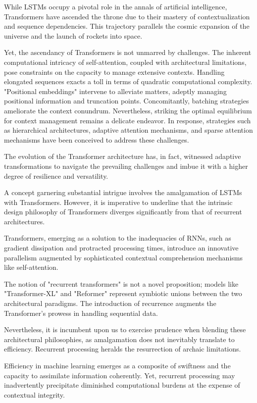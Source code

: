 \documentclass{article}
\begin{document}
While LSTMs occupy a pivotal role in the annals of artificial intelligence, Transformers have ascended the throne due to their mastery of contextualization and sequence dependencies. This trajectory parallels the cosmic expansion of the universe and the launch of rockets into space.

Yet, the ascendancy of Transformers is not unmarred by challenges. The inherent computational intricacy of self-attention, coupled with architectural limitations, pose constraints on the capacity to manage extensive contexts. Handling elongated sequences exacts a toll in terms of quadratic computational complexity. "Positional embeddings" intervene to alleviate matters, adeptly managing positional information and truncation points. Concomitantly, batching strategies ameliorate the context conundrum. Nevertheless, striking the optimal equilibrium for context management remains a delicate endeavor. In response, strategies such as hierarchical architectures, adaptive attention mechanisms, and sparse attention mechanisms have been conceived to address these challenges.

The evolution of the Transformer architecture has, in fact, witnessed adaptive transformations to navigate the prevailing challenges and imbue it with a higher degree of resilience and versatility.

A concept garnering substantial intrigue involves the amalgamation of LSTMs with Transformers. However, it is imperative to underline that the intrinsic design philosophy of Transformers diverges significantly from that of recurrent architectures.

Transformers, emerging as a solution to the inadequacies of RNNs, such as gradient dissipation and protracted processing times, introduce an innovative parallelism augmented by sophisticated contextual comprehension mechanisms like self-attention.

The notion of "recurrent transformers" is not a novel proposition; models like "Transformer-XL" and "Reformer" represent symbiotic unions between the two architectural paradigms. The introduction of recurrence augments the Transformer's prowess in handling sequential data.

Nevertheless, it is incumbent upon us to exercise prudence when blending these architectural philosophies, as amalgamation does not inevitably translate to efficiency. Recurrent processing heralds the resurrection of archaic limitations.

Efficiency in machine learning emerges as a composite of swiftness and the capacity to assimilate information coherently. Yet, recurrent processing may inadvertently precipitate diminished computational burdens at the expense of contextual integrity.
\end{document}
